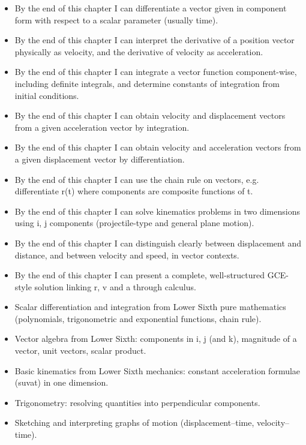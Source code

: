 \documentclass[11pt]{article}
\begin{document}
\begin{objectifs}
\begin{itemize}
\item By the end of this chapter I can differentiate a vector given in component form with respect to a scalar parameter (usually time).
\item By the end of this chapter I can interpret the derivative of a position vector physically as velocity, and the derivative of velocity as acceleration.
\item By the end of this chapter I can integrate a vector function component-wise, including definite integrals, and determine constants of integration from initial conditions.
\item By the end of this chapter I can obtain velocity and displacement vectors from a given acceleration vector by integration.
\item By the end of this chapter I can obtain velocity and acceleration vectors from a given displacement vector by differentiation.
\item By the end of this chapter I can use the chain rule on vectors, e.g. differentiate r(t) where components are composite functions of t.
\item By the end of this chapter I can solve kinematics problems in two dimensions using i, j components (projectile-type and general plane motion).
\item By the end of this chapter I can distinguish clearly between displacement and distance, and between velocity and speed, in vector contexts.
\item By the end of this chapter I can present a complete, well-structured GCE-style solution linking r, v and a through calculus.
\end{itemize}
\end{objectifs}

\begin{prerequis}
\begin{itemize}
\item Scalar differentiation and integration from Lower Sixth pure mathematics (polynomials, trigonometric and exponential functions, chain rule).
\item Vector algebra from Lower Sixth: components in i, j (and k), magnitude of a vector, unit vectors, scalar product.
\item Basic kinematics from Lower Sixth mechanics: constant acceleration formulae (suvat) in one dimension.
\item Trigonometry: resolving quantities into perpendicular components.
\item Sketching and interpreting graphs of motion (displacement–time, velocity–time).
\end{itemize}
\end{prerequis}
\end{document}
